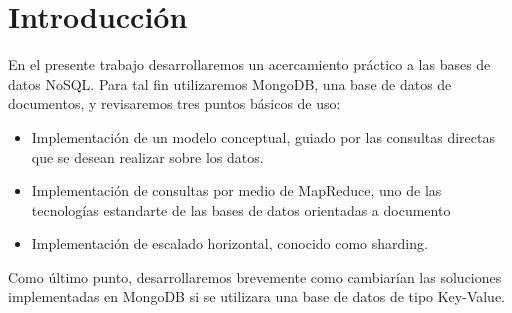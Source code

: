 \section{Introducción}

En el presente trabajo desarrollaremos un acercamiento práctico a las bases de datos NoSQL.
Para tal fin utilizaremos MongoDB, una base de datos de documentos, y revisaremos tres puntos básicos de uso:
\begin{itemize}
\item Implementación de un modelo conceptual, guiado por las consultas directas que se desean realizar sobre los datos.
\item Implementación de consultas por medio de MapReduce, uno de las tecnologías estandarte de las bases de datos orientadas a documento
\item Implementación de escalado horizontal, conocido como sharding.
\end{itemize}
Como último punto, desarrollaremos brevemente como cambiarían las soluciones implementadas en MongoDB si se utilizara una base de datos de tipo
Key-Value.
